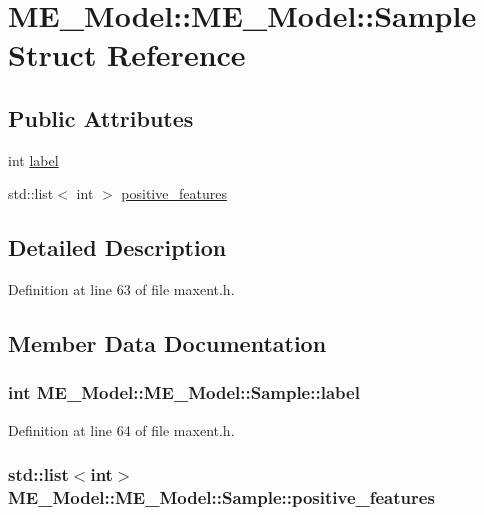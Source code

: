 \hypertarget{structME__Model_1_1Sample}{
\section{ME\_\-Model::ME\_\-Model::Sample Struct Reference}
\label{structME__Model_1_1Sample}
}
\subsection*{Public Attributes}
\begin{CompactItemize}
\item 
int \hyperlink{structME__Model_1_1Sample_01f7c4ba9333e3e81835bdd93764c272}{label}
\item 
std::list$<$ int $>$ \hyperlink{structME__Model_1_1Sample_5928a57beaa5ec61aa4bccb839e35773}{positive\_\-features}
\end{CompactItemize}


\subsection{Detailed Description}


Definition at line 63 of file maxent.h.

\subsection{Member Data Documentation}
\hypertarget{structME__Model_1_1Sample_01f7c4ba9333e3e81835bdd93764c272}{
\subsubsection[{label}]{\setlength{\rightskip}{0pt plus 5cm}int ME\_\-Model::ME\_\-Model::Sample::label}}
\label{structME__Model_1_1Sample_01f7c4ba9333e3e81835bdd93764c272}




Definition at line 64 of file maxent.h.\hypertarget{structME__Model_1_1Sample_5928a57beaa5ec61aa4bccb839e35773}{
\subsubsection[{positive\_\-features}]{\setlength{\rightskip}{0pt plus 5cm}std::list$<$int$>$ ME\_\-Model::ME\_\-Model::Sample::positive\_\-features}}
\label{structME__Model_1_1Sample_5928a57beaa5ec61aa4bccb839e35773}




